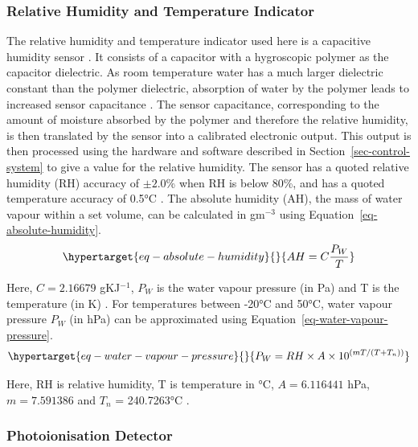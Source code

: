 \documentclass[
  a4paper,
]{scrbook}
\begin{document}
\hypertarget{relative-humidity-and-temperature-indicator}{%
\subsubsection*{Relative Humidity and Temperature
Indicator}\label{relative-humidity-and-temperature-indicator}}

The relative humidity and temperature indicator used here is a
capacitive humidity sensor \autocite{Telairesensor}. It consists of a
capacitor with a hygroscopic polymer as the capacitor dielectric. As
room temperature water has a much larger dielectric constant than the
polymer dielectric, absorption of water by the polymer leads to
increased sensor capacitance \autocite{capacitivesensor}. The sensor
capacitance, corresponding to the amount of moisture absorbed by the
polymer and therefore the relative humidity, is then translated by the
sensor into a calibrated electronic output. This output is then
processed using the hardware and software described in
Section~\ref{sec-control-system} to give a value for the relative
humidity. The sensor has a quoted relative humidity (RH) accuracy of
\(\pm 2.0\)\% when RH is below 80\%, and has a quoted temperature
accuracy of 0.5°C \autocite{Telairesensor}. The absolute humidity (AH),
the mass of water vapour within a set volume, can be calculated in
gm\(^{-3}\) using Equation~\ref{eq-absolute-humidity}.
\begin{equation}\protect\hypertarget{eq-absolute-humidity}{}{
AH = C\frac{P_W}{T}
}\label{eq-absolute-humidity}\end{equation}

Here, \(C = 2.16679\) gKJ\(^{-1}\), \(P_W\) is the water vapour pressure
(in Pa) and T is the temperature (in K) \autocite{humidityformula}. For
temperatures between -20°C and 50°C, water vapour pressure \(P_W\) (in
hPa) can be approximated using Equation~\ref{eq-water-vapour-pressure}.
\begin{equation}\protect\hypertarget{eq-water-vapour-pressure}{}{
P_W = RH \times A \times 10^{(mT/(T+T_{n}))}
}\label{eq-water-vapour-pressure}\end{equation}

Here, RH is relative humidity, T is temperature in °C, \(A = 6.116441\)
hPa, \(m = 7.591386\) and \(T_{n}\) = 240.7263°C
\autocite{humidityformula}.

\hypertarget{photoionisation-detector}{%
\subsubsection*{Photoionisation
Detector}\label{photoionisation-detector}}
\end{document}
